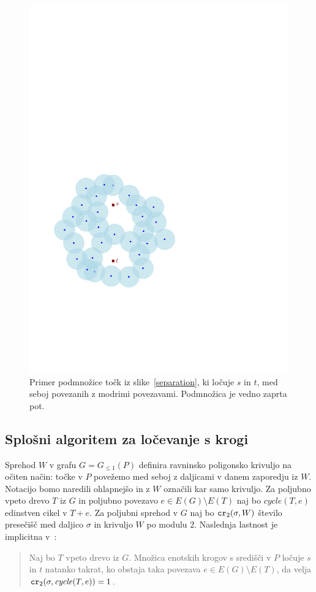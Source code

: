 \documentclass[a4paper, 12pt]{book}
\newcommand{\GG}{\ensuremath{G_{\le 1}}}
\newcommand{\cycle}{\mathit{cycle}}
\newcommand\CR{\mbox{\tt cr}_2}		  %
\begin{document}
\begin{figure}[htp]
\centerline{\includegraphics[scale=0.6,page=3]{pics/separation.pdf}}
\caption{Primer podmnožice točk iz slike~\ref{separation}, ki ločuje $s$ in $t$, med seboj povezanih z modrimi povezavami. Podmnožica je vedno zaprta pot.}
\label{walk}
\end{figure}

\subsection{Splošni algoritem za ločevanje s krogi}
\label{generic-section}

Sprehod $W$ v grafu $G=\GG(P)$ definira ravninsko poligonsko krivuljo na očiten način: točke v $P$ povežemo med seboj z daljicami v danem zaporedju iz $W$. Notacijo bomo naredili ohlapnejšo in z $W$ označili kar samo krivuljo. Za poljubno vpeto drevo $T$ iz $G$ in poljubno povezavo $e\in E(G)\setminus E(T)$ naj bo $\cycle(T,e)$ edinstven cikel v $T + e$. Za poljubni sprehod v $G$ naj bo $\CR (\sigma,W)$  število presečišč med daljico $\sigma$ in krivuljo $W$ po modulu $2$. Naslednja lastnost je implicitna v~\cite{CG16}:
\begin{quote}
Naj bo $T$ vpeto drevo iz $G$. Množica enotskih krogov s središči v $P$ ločuje $s$ in $t$ natanko takrat, ko obstaja taka povezava $e\in E(G) \setminus E(T)$, da velja $\CR (\sigma, \cycle(T,e))=1$.
\end{quote}
\end{document}
